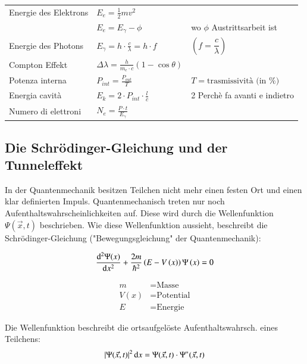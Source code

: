 \renewcommand{\arraystretch}{1.9}
\begin{tabular}{lll}
    Energie des Elektrons & $\displaystyle E_{e} = \frac{1}{2} m v^{2}$ & \\ 
						& $\displaystyle E_e = E_\gamma - \phi$ & wo $\phi$ Austrittsarbeit ist\\
    Energie des Photons & $\displaystyle E_{\gamma} = h \cdot \frac{c}{\lambda} = h \cdot f$ & $\left(f = \dfrac{c}{\lambda}\right)$\\ 
    Compton Effekt & $\displaystyle \Delta \lambda = \frac{h}{m_{e} \cdot c} (1 - \cos\theta)$ & \\ 
    Potenza interna & $\displaystyle P_{int} = \frac{P_{out}}{T}$ & $T = \text{trasmissività (in \%)}$ \\ 
    Energia cavità & $\displaystyle E_k = 2 \cdot P_{int} \cdot \frac{l}{c}$ & 2 Perchè fa avanti e indietro\\
	Numero di elettroni & $\displaystyle N_e = \frac{P\cdot t}{E_\gamma}$&
\end{tabular}
\renewcommand{\arraystretch}{1}


\subsection{Die Schrödinger-Gleichung und der Tunneleffekt}
In der Quantenmechanik besitzen Teilchen nicht mehr einen festen Ort und einen klar definierten Impuls. 
Quantenmechanisch treten nur noch Aufenthaltswahrscheinlichkeiten auf. 
Diese wird durch die Wellenfunktion $\Psi \left(\stackrel{\to }{x},t\right)$ beschrieben. 
Wie diese Wellenfunktion aussieht, beschreibt die Schrödinger-Gleichung ("Bewegungsgleichung" der Quantenmechanik):

\begin{minipage}{0.5\linewidth}
	\[\frac{\mathop{} \! \mathrm{d}^2\Psi (x)}{\mathop{} \! \mathrm{d} x^2}+\frac{2m}{{\hbar }^{2}}\left(E-V\left(x\right)\right)\Psi \left(x\right)=0\]
\end{minipage}
\begin{minipage}{0.28\linewidth}
	\begin{align*}
		m &= \text{Masse}\\
		V(x) &= \text{Potential}\\
		E &= \text{Energie}
	\end{align*} 
\end{minipage}

Die Wellenfunktion beschreibt die ortsaufgelöste Aufenthaltswahrsch. eines Teilchens: 
\[
	|\Psi(\vec{x}, t)|^2 \mathop{} \! \mathrm{d} x = \Psi(\vec{x}, t) \cdot \Psi^*(\vec{x}, t) 
\]

